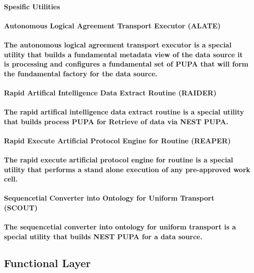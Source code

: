 \documentclass{acm_proc_article-sp}
\begin{document}
\paragraph{Spesific Utilities}
\paragraph{\textbf{Autonomous Logical Agreement Transport Executor (ALATE)}}
\paragraph{The autonomous logical agreement transport executor is a special utility that builds a fundamental metadata view of the data source it is processing and configures a fundamental set of PUPA that will form the fundamental factory for the data source.}
\paragraph{\textbf{Rapid Artifical Intelligence Data Extract Routine (RAIDER)}}
\paragraph{The rapid artifical intelligence data extract routine is a special utility that builds process PUPA for Retrieve of data via NEST PUPA.}
\paragraph{\textbf{Rapid Execute Artificial Protocol Engine for Routine (REAPER)}}
\paragraph{The rapid execute artificial protocol engine for routine is a special utility that performs a stand alone execution of any pre-approved work cell.}
\paragraph{\textbf{Sequencetial Converter into Ontology for Uniform Transport (SCOUT)}}
\paragraph{The sequencetial converter into ontology for uniform transport is a special utility that builds NEST PUPA for a data source.}
\subsection{Functional Layer}
\end{document}
